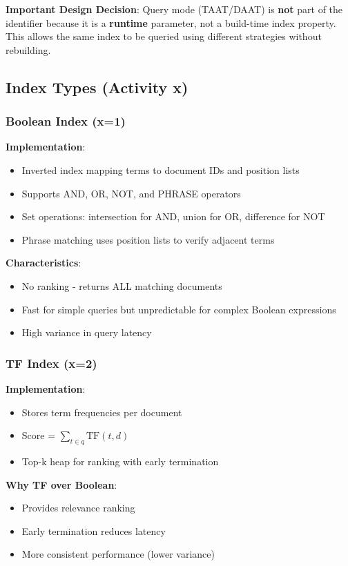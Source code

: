 \documentclass[12pt,a4paper]{article}
\begin{document}
\textbf{Important Design Decision}: Query mode (TAAT/DAAT) is \textbf{not} part of the identifier because it is a \textbf{runtime} parameter, not a build-time index property. This allows the same index to be queried using different strategies without rebuilding.

\subsection{Index Types (Activity x)}

\subsubsection{Boolean Index (x=1)}

\textbf{Implementation}:
\begin{itemize}
    \item Inverted index mapping terms to document IDs and position lists
    \item Supports AND, OR, NOT, and PHRASE operators
    \item Set operations: intersection for AND, union for OR, difference for NOT
    \item Phrase matching uses position lists to verify adjacent terms
\end{itemize}

\textbf{Characteristics}:
\begin{itemize}
    \item No ranking - returns ALL matching documents
    \item Fast for simple queries but unpredictable for complex Boolean expressions
    \item High variance in query latency
\end{itemize}

\subsubsection{TF Index (x=2)}

\textbf{Implementation}:
\begin{itemize}
    \item Stores term frequencies per document
    \item Score = $\sum_{t \in q} \text{TF}(t, d)$
    \item Top-k heap for ranking with early termination
\end{itemize}

\textbf{Why TF over Boolean}:
\begin{itemize}
    \item Provides relevance ranking
    \item Early termination reduces latency
    \item More consistent performance (lower variance)
\end{itemize}
\end{document}
